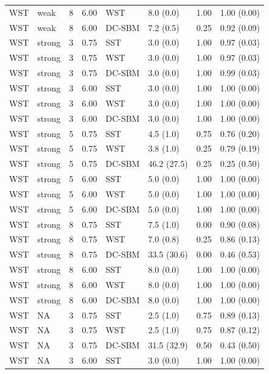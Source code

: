 \begin{table}
\begin{tabular}[t]{llrrllll}
\addlinespace
WST & weak & 8 & 6.00 & WST & 8.0 (0.0) & 1.00 & 1.00 (0.00)\\
WST & weak & 8 & 6.00 & DC-SBM & 7.2 (0.5) & 0.25 & 0.92 (0.09)\\
WST & strong & 3 & 0.75 & SST & 3.0 (0.0) & 1.00 & 0.97 (0.03)\\
WST & strong & 3 & 0.75 & WST & 3.0 (0.0) & 1.00 & 0.97 (0.03)\\
WST & strong & 3 & 0.75 & DC-SBM & 3.0 (0.0) & 1.00 & 0.99 (0.03)\\
\addlinespace
WST & strong & 3 & 6.00 & SST & 3.0 (0.0) & 1.00 & 1.00 (0.00)\\
WST & strong & 3 & 6.00 & WST & 3.0 (0.0) & 1.00 & 1.00 (0.00)\\
WST & strong & 3 & 6.00 & DC-SBM & 3.0 (0.0) & 1.00 & 1.00 (0.00)\\
WST & strong & 5 & 0.75 & SST & 4.5 (1.0) & 0.75 & 0.76 (0.20)\\
WST & strong & 5 & 0.75 & WST & 3.8 (1.0) & 0.25 & 0.79 (0.19)\\
\addlinespace
WST & strong & 5 & 0.75 & DC-SBM & 46.2 (27.5) & 0.25 & 0.25 (0.50)\\
WST & strong & 5 & 6.00 & SST & 5.0 (0.0) & 1.00 & 1.00 (0.00)\\
WST & strong & 5 & 6.00 & WST & 5.0 (0.0) & 1.00 & 1.00 (0.00)\\
WST & strong & 5 & 6.00 & DC-SBM & 5.0 (0.0) & 1.00 & 1.00 (0.00)\\
WST & strong & 8 & 0.75 & SST & 7.5 (1.0) & 0.00 & 0.90 (0.08)\\
\addlinespace
WST & strong & 8 & 0.75 & WST & 7.0 (0.8) & 0.25 & 0.86 (0.13)\\
WST & strong & 8 & 0.75 & DC-SBM & 33.5 (30.6) & 0.00 & 0.46 (0.53)\\
WST & strong & 8 & 6.00 & SST & 8.0 (0.0) & 1.00 & 1.00 (0.00)\\
WST & strong & 8 & 6.00 & WST & 8.0 (0.0) & 1.00 & 1.00 (0.00)\\
WST & strong & 8 & 6.00 & DC-SBM & 8.0 (0.0) & 1.00 & 1.00 (0.00)\\
\addlinespace
WST & NA & 3 & 0.75 & SST & 2.5 (1.0) & 0.75 & 0.89 (0.13)\\
WST & NA & 3 & 0.75 & WST & 2.5 (1.0) & 0.75 & 0.87 (0.12)\\
WST & NA & 3 & 0.75 & DC-SBM & 31.5 (32.9) & 0.50 & 0.43 (0.50)\\
WST & NA & 3 & 6.00 & SST & 3.0 (0.0) & 1.00 & 1.00 (0.00)\\

\end{tabular}
\end{table}
